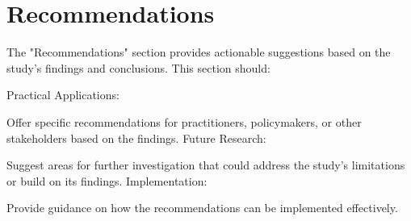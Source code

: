 \section{Recommendations}

The "Recommendations" section provides actionable suggestions based on the study's findings and conclusions. This section should:

Practical Applications:

Offer specific recommendations for practitioners, policymakers, or other stakeholders based on the findings.
Future Research:

Suggest areas for further investigation that could address the study’s limitations or build on its findings.
Implementation:

Provide guidance on how the recommendations can be implemented effectively.
